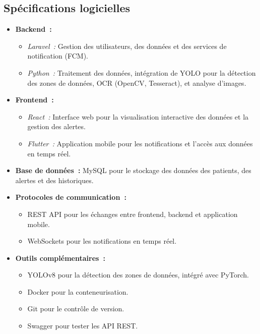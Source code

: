 \subsection{Spécifications logicielles}
\label{subsec:spec_logiciels}
\begin{itemize}
    \item \textbf{Backend~:}
    \begin{itemize}
        \item \textit{Laravel~:} Gestion des utilisateurs, des données et des services de notification (FCM).
        \item \textit{Python~:} Traitement des données, intégration de YOLO pour la détection des zones de données, OCR (OpenCV, Tesseract), et analyse d'images. %
    \end{itemize}
    \item \textbf{Frontend~:}
    \begin{itemize}
        \item \textit{React~:} Interface web pour la visualisation interactive des données et la gestion des alertes.
        \item \textit{Flutter~:} Application mobile pour les notifications et l'accès aux données en temps réel.
    \end{itemize}
    \item \textbf{Base de données~:} MySQL pour le stockage des données des patients, des alertes et des historiques.
    \item \textbf{Protocoles de communication~:}
    \begin{itemize}
        \item REST API pour les échanges entre frontend, backend et application mobile.
        \item WebSockets pour les notifications en temps réel.
    \end{itemize}
    \item \textbf{Outils complémentaires~:}
    \begin{itemize}
        \item YOLOv8 pour la détection des zones de données, intégré avec PyTorch. %
        \item Docker pour la conteneurisation.
        \item Git pour le contrôle de version.
        \item Swagger pour tester les API REST.
    \end{itemize}
\end{itemize}

